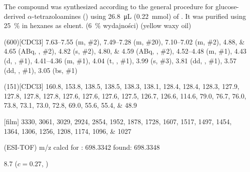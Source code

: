 The compound was synthesized according to the general procedure for glucose-derived $\alpha$-tetrazoloamines () using \SI{26.8}{\micro\liter} (\SI{0.22}{\milli\mol}) of .
It was purified using \SI{25}{\percent}  in hexanes as eluent.
(\SI{6}{\percent} wydajności) (yellow waxy oil)
\begin{fullexp}
	\NMR(600)[CDCl3] \numrange{7.63}{7.55} (m, \#{2}), \numrange{7.49}{7.28} (m, \#{20}), \numrange{7.10}{7.02} (m, \#{2}), \numlist{4.88;4.65} (ABq, , \#{2}), \num{4.82} (s, \#{2}), \numlist{4.80;4.59} (ABq, , \#{2}), \numrange{4.52}{4.48} (m, \#{1}), \num{4.43} (d, , \#{1}), \numrange{4.41}{4.36} (m, \#{1}), \num{4.04} (t, , \#{1}), \num{3.99} (s, \#{3}), \num{3.81} (dd, , \#{1}), \num{3.57} (dd, , \#{1}), \num{3.05} (bs, \#{1})\par\noindent
	(151)[CDCl3] \numlist{160.8; 153.8; 138.5; 138.5; 138.3; 138.1; 128.4; 128.4; 128.3; 127.9; 127.8; 127.8; 127.8; 127.6; 127.6; 127.6; 127.5; 126.7; 126.6; 114.6; 79.0; 76.7; 76.0; 73.8; 73.1; 73.0; 72.8; 69.0; 55.6; 55.4; 48.9}\par\noindent
	[film] \numlist{3330; 3061; 3029; 2924; 2854; 1952; 1878; 1728; 1607; 1517; 1497; 1454; 1364; 1306; 1256; 1208; 1174; 1096; 1027}\par\noindent
	 (ESI-TOF) m/z calcd for : \num{698.3342} found: \num{698.3348}\par\noindent
	\data{[$\alpha^{23}_D$]~$=$} \num{8.7} ($c = 0.27$, )
\end{fullexp}

